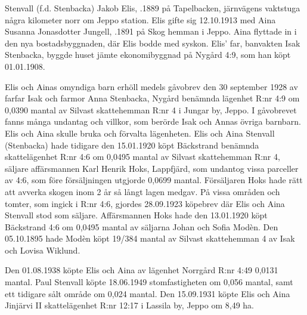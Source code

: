 Stenvall (f.d. Stenbacka) Jakob Elis, .1889 på Tapelbacken, järnvägens vaktstuga några kilometer norr om Jeppo station. Elis gifte sig 12.10.1913 med Aina Susanna Jonasdotter Jungell, .1891 på Skog hemman i Jeppo. Aina flyttade in i den nya bostadsbyggnaden, där Elis bodde med syskon.  Elis' far, banvakten Isak Stenbacka, byggde huset jämte ekonomibyggnad på Nygård 4:9, som han köpt 01.01.1908.
\begin{jhchildren}
  \item {}
  \item {}
  \item {}
  \item {}
  \item {}
  \item {}
\end{jhchildren}
Elis och Ainas omyndiga barn erhöll medels gåvobrev den 30 september 1928 av farfar Isak och farmor Anna Stenbacka, Nygård benämnda lägenhet R:nr 4:9 om 0,0390 mantal av Silvast skattehemman R:nr 4 i Jungar by, Jeppo. I gåvobrevet fanns många undantag och villkor, som berörde Isak och Annas övriga barnbarn. Elis och Aina skulle bruka och förvalta lägenheten. Elis och Aina Stenvall (Stenbacka) hade tidigare den 15.01.1920 köpt Bäckstrand benämnda skattelägenhet R:nr 4:6 om 0,0495 mantal av Silvast skattehemman R:nr 4, säljare affärsmannen Karl Henrik Hoks, Lappfjärd, som undantog vissa parceller av 4:6, som före försäljningen utgjorde 0,0699 mantal. Försäljaren Hoks hade rätt att avverka skogen inom 2 år så långt lagen medgav. På vissa områden och tomter, som ingick i R:nr 4:6, gjordes 28.09.1923 köpebrev där Elis och Aina Stenvall stod som säljare. Affärsmannen Hoks hade den 13.01.1920 köpt Bäckstrand 4:6 om 0,0495 mantal av säljarna Johan och Sofia Modèn. Den 05.10.1895 hade Modèn köpt 19/384 mantal av Silvast skattehemman 4 av Isak och Lovisa Wiklund.

Den 01.08.1938 köpte Elis och Aina av lägenhet Norrgård R:nr 4:49  0,0131 mantal. Paul Stenvall köpte 18.06.1949 stomfastigheten om 0,056 mantal, samt ett tidigare sålt område om 0,024 mantal. Den 15.09.1931 köpte Elis och Aina Jinjärvi II skattelägenhet R:nr 12:17 i Lassila by, Jeppo om 8,49 ha.

